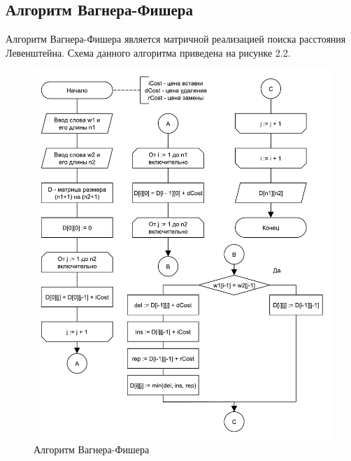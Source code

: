 \subsection{Алгоритм Вагнера-Фишера}
Алгоритм Вагнера-Фишера является матричной реализацией поиска расстояния Левенштейна. Схема данного алгоритма приведена на рисунке 2.2.
\begin{figure}[H]
    \centering
    \includegraphics[scale=0.75]{pdf/wagner-fischer-all.pdf}
    \caption{Алгоритм Вагнера-Фишера}
\end{figure}


